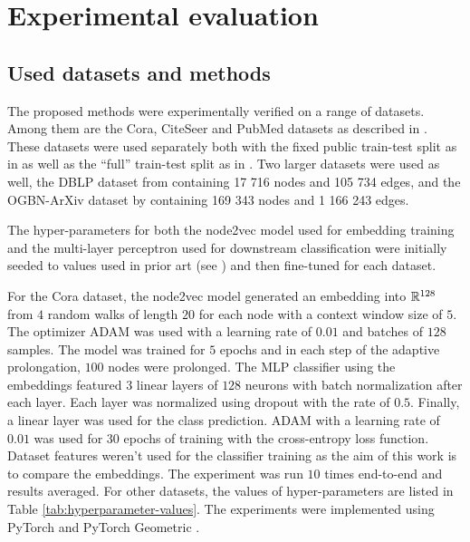\section{Experimental evaluation}

\subsection{Used datasets and methods}

The proposed methods were experimentally verified on a range of datasets. Among them are the Cora, CiteSeer and PubMed datasets as described in \cite{yang_revisiting_2016}. These datasets were used separately both with the fixed public train-test split as in \cite{yang_revisiting_2016} as well as the \enquote{full} train-test split as in \cite{chen_fastgcn_2018}. Two larger datasets were used as well, the DBLP dataset from \cite{bojchevski_deep_2018} containing 17 716 nodes and 105 734 edges, and the OGBN-ArXiv dataset by \cite{hu_open_2021} containing 169 343 nodes and 1 166 243 edges.

The hyper-parameters for both the node2vec model used for embedding training and the multi-layer perceptron used for downstream classification were initially seeded to values used in prior art (see \cite{fey_fast_2019, hu_open_2021}) and then fine-tuned for each dataset.

For the Cora dataset, the node2vec model generated an embedding into \( \mathbb{R}^{128} \) from \( 4 \) random walks of length \( 20 \) for each node with a context window size of \( 5 \). The optimizer ADAM \cite{kingma_adam:_2017} was used with a learning rate of \( 0.01 \) and batches of \( 128 \) samples. The model was trained for \( 5 \) epochs and in each step of the adaptive prolongation, \( 100 \) nodes were prolonged. The MLP classifier using the embeddings featured \( 3 \) linear layers of \( 128 \) neurons with batch normalization after each layer. Each layer was normalized using dropout \cite{srivastava_dropout_2014} with the rate of \( 0.5 \). Finally, a linear layer was used for the class prediction. ADAM with a learning rate of \( 0.01 \)  was used for \( 30 \) epochs of training with the cross-entropy loss function. Dataset features weren't used for the classifier training as the aim of this work is to compare the embeddings. The experiment was run \( 10 \) times end-to-end and results averaged. For other datasets, the values of hyper-parameters are listed in Table \ref{tab:hyperparameter-values}. The experiments were implemented using PyTorch \cite{paszke_pytorch_2019} and PyTorch Geometric \cite{fey_fast_2019}.

